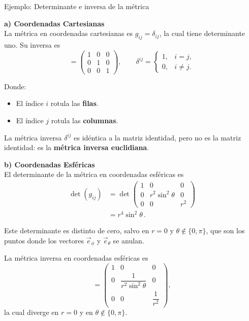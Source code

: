 \documentclass[../apunte_mecanica_clasica.tex]{subfiles}%
\begin{document}
\begin{apuntebloque}{Ejemplo: Determinante e inversa de la métrica}

\textbf{a) Coordenadas Cartesianas}  \\

La métrica en coordenadas cartesianas es $g_{ij} = \delta_{ij}$, 
la cual tiene determinante uno. Su inversa es
\begin{equation*}
    [\delta^{ij}] =
    \begin{pmatrix}
        1 & 0 & 0 \\
        0 & 1 & 0 \\
        0 & 0 & 1
    \end{pmatrix},
    \qquad
    \delta^{ij} =
    \begin{cases}
        1, & i = j, \\[6pt]
        0, & i \neq j.
    \end{cases}
\end{equation*}

Donde:
\begin{itemize}
    \item El índice $i$ rotula las \textbf{filas}.
    \item El índice $j$ rotula las \textbf{columnas}.
\end{itemize}

La métrica inversa $\delta^{ij}$ es idéntica a la matriz identidad, 
pero no es la matriz identidad: es la \textbf{métrica inversa euclidiana}.

\bigskip

\textbf{b) Coordenadas Esféricas} \\ 

El determinante de la métrica en coordenadas esféricas es
\begin{align*}
    \det(g_{ij}) &=
    \det\!
    \begin{pmatrix}
        1 & 0 & 0 \\
        0 & r^2\sin^2\theta & 0 \\
        0 & 0 & r^2
    \end{pmatrix} \\[4pt]
    &= r^4 \sin^2\theta \,.
\end{align*}

Este determinante es distinto de cero, salvo en $r=0$ y 
$\theta \notin \{ 0,\pi \}$, que son los puntos donde los vectores 
$\vec{e}_\phi$ y $\vec{e}_\theta$ se anulan.  

La métrica inversa en coordenadas esféricas es
\begin{equation*}
    [g^{ij}] =
    \begin{pmatrix}
        1 & 0 & 0 \\
        0 & \dfrac{1}{r^2 \sin^2\theta} & 0 \\
        0 & 0 & \dfrac{1}{r^2}
    \end{pmatrix},
\end{equation*}
la cual diverge en $r=0$ y en $\theta \notin \{0,\pi\}
$.
\end{apuntebloque}
\end{document}
